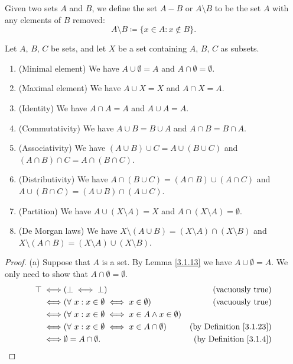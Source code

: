 \setcounter{theorem}{26}
\begin{definition}\label{3.1.27}
    Given two sets \(A\) and \(B\), we define the set \(A - B\) or \(A \setminus B\) to be the set \(A\) with any elements of \(B\) removed:
    \[
        A \setminus B \coloneqq \{x \in A : x \notin B\}.
    \]
\end{definition}

\begin{proposition}\label{3.1.28}
    Let \(A\), \(B\), \(C\) be sets, and let \(X\) be a set containing \(A\), \(B\), \(C\) as subsets.
    \begin{enumerate}
        \item (Minimal element) We have \(A \cup \emptyset = A\) and \(A \cap \emptyset = \emptyset\).
        \item (Maximal element) We have \(A \cup X = X\) and \(A \cap X = A\).
        \item (Identity) We have \(A \cap A = A\) and \(A \cup A = A\).
        \item (Commutativity) We have \(A \cup B = B \cup A\) and \(A \cap B = B \cap A\).
        \item (Associativity) We have \((A \cup B) \cup C = A \cup (B \cup C)\) and \((A \cap B) \cap C = A \cap (B \cap C)\).
        \item (Distributivity) We have \(A \cap (B \cup C) = (A \cap B) \cup (A \cap C)\) and \(A \cup (B \cap C) = (A \cup B) \cap (A \cup C)\).
        \item (Partition) We have \(A \cup (X \setminus A) = X\) and \(A \cap (X \setminus A) = \emptyset\).
        \item (De Morgan laws) We have \(X \setminus (A \cup B) = (X \setminus A) \cap (X \setminus B)\) and \(X \setminus (A \cap B) = (X \setminus A) \cup (X \setminus B)\).
    \end{enumerate}
\end{proposition}

\begin{proof}{(a)}
    Suppose that \(A\) is a set.
    By Lemma \ref{3.1.13} we have \(A \cup \emptyset = A\).
    We only need to show that \(A \cap \emptyset = \emptyset\).
    \begin{align*}
        \top \iff & (\bot \iff \bot)                                                  & \text{(vacuously true)}             \\
        \iff      & (\forall\ x : x \in \emptyset \iff x \in \emptyset)               & \text{(vacuously true)}             \\
        \iff      & (\forall\ x : x \in \emptyset \iff x \in A \land x \in \emptyset)                                       \\
        \iff      & (\forall\ x : x \in \emptyset \iff x \in A \cap \emptyset)        & \text{(by Definition \ref{3.1.23})} \\
        \iff      & \emptyset = A \cap \emptyset.                                     & \text{(by Definition \ref{3.1.4})}
    \end{align*}
\end{proof}


